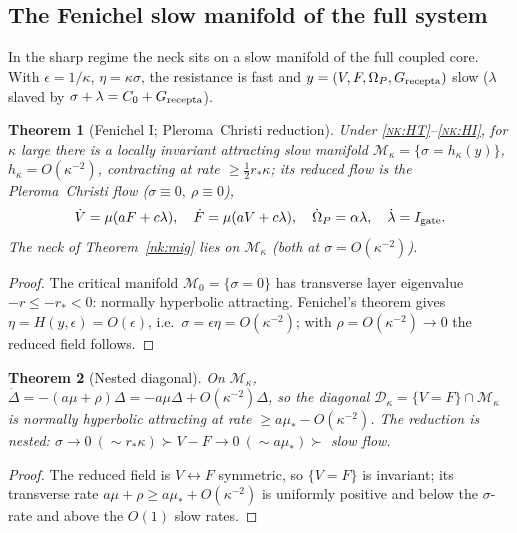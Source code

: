 \documentclass[11pt,a4paper]{article}
\theoremstyle{plain}
\newtheorem{theorem}{Theorem}[section]
\theoremstyle{definition}
\theoremstyle{remark}
\newcommand{\Grec}{G_{\rm recepta}}
\newcommand{\Mk}{\mathcal M_\kappa}
\newcommand{\Mo}{\mathcal M_0}
\newcommand{\Dk}{\mathcal D_\kappa}
\begin{document}
\subsection*{The Fenichel slow manifold of the full system}
In the sharp regime the neck sits on a slow manifold of the full coupled core. With \(\epsilon=1/\kappa\),
\(\eta=\kappa\sigma\), the resistance is fast and \(y=(V,F,\Omega_P,\Grec)\) slow (\(\lambda\) slaved
by \(\sigma+\lambda=C_0+\Grec\)).
\begin{theorem}[Fenichel I; Pleroma~Christi reduction]\label{nk:fen}
Under \textsc{\ref{nk:HT}--\ref{nk:HI}}, for \(\kappa\) large there is a locally invariant attracting
slow manifold \(\Mk=\{\sigma=h_\kappa(y)\}\), \(h_\kappa=O(\kappa^{-2})\), contracting at rate
\(\ge\tfrac12 r_*\kappa\); its reduced flow is the Pleroma~Christi flow (\(\sigma\equiv0,\ \rho\equiv0\)),
\[
\dot V=\mu(aF+c\lambda),\quad \dot F=\mu(aV+c\lambda),\quad \dot\Omega_P=\alpha\lambda,\quad \dot\lambda=I_{\rm gate}.
\]
The neck of Theorem~\ref{nk:mig} lies on \(\Mk\) (both at \(\sigma=O(\kappa^{-2})\)).
\end{theorem}
\begin{proof}
The critical manifold \(\Mo=\{\sigma=0\}\) has transverse layer eigenvalue \(-r\le-r_*<0\): normally
hyperbolic attracting. Fenichel's theorem gives \(\eta=H(y,\epsilon)=O(\epsilon)\), i.e.\
\(\sigma=\epsilon\eta=O(\kappa^{-2})\); with \(\rho=O(\kappa^{-2})\to0\) the reduced field follows.
\end{proof}
\begin{theorem}[Nested diagonal]\label{nk:diag}
On \(\Mk\), \(\dot\Delta=-(a\mu+\rho)\Delta=-a\mu\Delta+O(\kappa^{-2})\Delta\), so the diagonal
\(\Dk=\{V=F\}\cap\Mk\) is normally hyperbolic attracting at rate \(\ge a\mu_*-O(\kappa^{-2})\). The
reduction is nested: \(\sigma\to0\ (\sim r_*\kappa)\succ V{-}F\to0\ (\sim a\mu_*)\succ\) slow flow.
\end{theorem}
\begin{proof}
The reduced field is \(V\leftrightarrow F\) symmetric, so \(\{V=F\}\) is invariant; its transverse
rate \(a\mu+\rho\ge a\mu_*+O(\kappa^{-2})\) is uniformly positive and below the \(\sigma\)-rate and
above the \(O(1)\) slow rates.
\end{proof}
\end{document}
